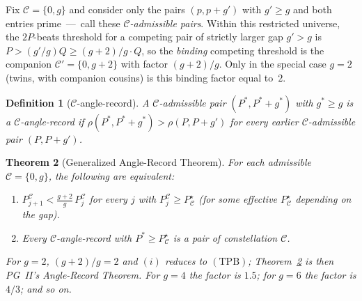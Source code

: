 \documentclass[11pt]{article}
\newtheorem{theorem}{Theorem}
\newtheorem{definition}[theorem]{Definition}
\begin{document}
Fix $\mathcal{C}=\{0,g\}$ and consider only the pairs
$(p,p+g')$ with $g'\ge g$ and both entries prime~---~call these
\emph{$\mathcal{C}$-admissible pairs}. Within this restricted
universe, the $2P$-beats threshold for a competing pair of strictly
larger gap $g'>g$ is $P>(g'/g)Q\ge(g+2)/g\cdot Q$, so the
\emph{binding} competing threshold is the companion
$\mathcal{C}'=\{0,g+2\}$ with factor $(g+2)/g$. Only in the special
case $g=2$ (twins, with companion cousins) is this binding factor
equal to~$2$.

\begin{definition}[$\mathcal{C}$-angle-record]
A $\mathcal{C}$-admissible pair $(P^*,P^*+g^*)$ with $g^*\ge g$ is a
\emph{$\mathcal{C}$-angle-record} if
$\rho(P^*,P^*+g^*)>\rho(P,P+g')$ for every earlier
$\mathcal{C}$-admissible pair $(P,P+g')$.
\end{definition}

\begin{theorem}[Generalized Angle-Record Theorem]
\label{thm:gen-angle}
For each admissible $\mathcal{C}=\{0,g\}$, the following are
equivalent:
\begin{enumerate}
\item[(i)] $P^{\mathcal{C}}_{j+1}<\frac{g+2}{g}\,P^{\mathcal{C}}_j$
for every $j$ with $P^{\mathcal{C}}_j\ge P^{\star}_\mathcal{C}$ (for
some effective $P^{\star}_\mathcal{C}$ depending on the gap).
\item[(ii)] Every $\mathcal{C}$-angle-record with
$P^*\ge P^{\star}_\mathcal{C}$ is a pair of constellation $\mathcal{C}$.
\end{enumerate}
For $g=2$, $(g+2)/g=2$ and $(i)$ reduces to $(\mathrm{TPB})$;
Theorem~\ref{thm:gen-angle} is then PG~II's Angle-Record Theorem.
For $g=4$ the factor is $1.5$; for $g=6$ the factor is $4/3$; and so
on.
\end{theorem}
\end{document}
